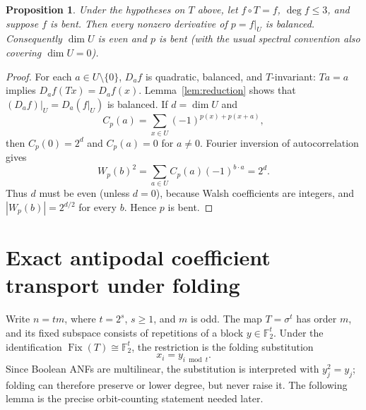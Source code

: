 \documentclass[11pt,a4paper]{article}
\newtheorem{proposition}[theorem]{Proposition}
\theoremstyle{remark}
\theoremstyle{plain}
\newcommand{\F}{\mathbb F_2}
\newcommand{\Fix}{\operatorname{Fix}}
\begin{document}
\begin{proposition}\label{prop:restriction}
Under the hypotheses on $T$ above, let $f\circ T=f$, $\deg f\le3$, and suppose $f$ is bent. Then every nonzero derivative of $p=f|_U$ is balanced. Consequently $\dim U$ is even and $p$ is bent (with the usual spectral convention also covering $\dim U=0$).
\end{proposition}
\begin{proof}
For each $a\in U\setminus\{0\}$, $D_af$ is quadratic, balanced, and $T$-invariant: $Ta=a$ implies $D_af(Tx)=D_af(x)$. Lemma~\ref{lem:reduction} shows that $(D_af)|_U=D_a(f|_U)$ is balanced. If $d=\dim U$ and
\[
C_p(a)=\sum_{x\in U}(-1)^{p(x)+p(x+a)},
\]
then $C_p(0)=2^d$ and $C_p(a)=0$ for $a\ne0$. Fourier inversion of autocorrelation gives
\[
W_p(b)^2=\sum_{a\in U}C_p(a)(-1)^{b\cdot a}=2^d.
\]
Thus $d$ must be even (unless $d=0$), because Walsh coefficients are integers, and $|W_p(b)|=2^{d/2}$ for every $b$. Hence $p$ is bent.
\end{proof}

\section{Exact antipodal coefficient transport under folding}
Write $n=tm$, where $t=2^s$, $s\ge1$, and $m$ is odd. The map $T=\sigma^t$ has order $m$, and its fixed subspace consists of repetitions of a block $y\in\F^t$. Under the identification $\Fix(T)\cong\F^t$, the restriction is the folding substitution
\[
x_i=y_{i\bmod t}.
\]
Since Boolean ANFs are multilinear, the substitution is interpreted with $y_j^2=y_j$; folding can therefore preserve or lower degree, but never raise it.
The following lemma is the precise orbit-counting statement needed later.
\end{document}
